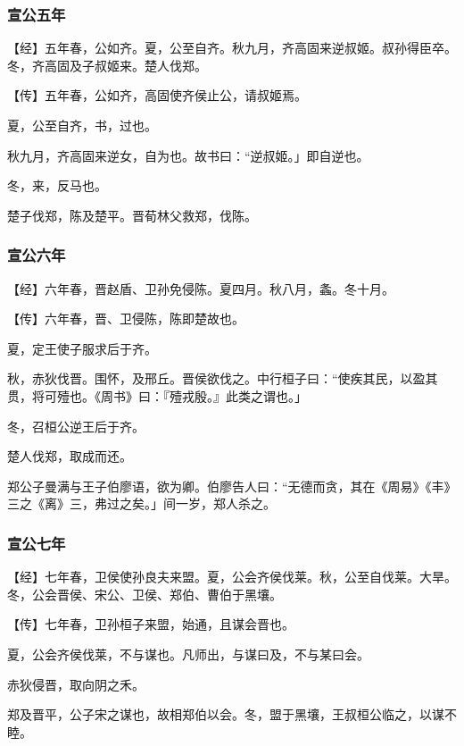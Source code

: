 \documentclass[]{article}
\begin{document}
\hypertarget{header-n1345}{%
\subsubsection{宣公五年}\label{header-n1345}}

【经】五年春，公如齐。夏，公至自齐。秋九月，齐高固来逆叔姬。叔孙得臣卒。冬，齐高固及子叔姬来。楚人伐郑。

【传】五年春，公如齐，高固使齐侯止公，请叔姬焉。

夏，公至自齐，书，过也。

秋九月，齐高固来逆女，自为也。故书曰：``逆叔姬。」即自逆也。

冬，来，反马也。

楚子伐郑，陈及楚平。晋荀林父救郑，伐陈。

\hypertarget{header-n1354}{%
\subsubsection{宣公六年}\label{header-n1354}}

【经】六年春，晋赵盾、卫孙免侵陈。夏四月。秋八月，螽。冬十月。

【传】六年春，晋、卫侵陈，陈即楚故也。

夏，定王使子服求后于齐。

秋，赤狄伐晋。围怀，及邢丘。晋侯欲伐之。中行桓子曰：``使疾其民，以盈其贯，将可殪也。《周书》曰：『殪戎殷。』此类之谓也。」

冬，召桓公逆王后于齐。

楚人伐郑，取成而还。

郑公子曼满与王子伯廖语，欲为卿。伯廖告人曰：``无德而贪，其在《周易》《丰》三之《离》三，弗过之矣。」间一岁，郑人杀之。

\hypertarget{header-n1364}{%
\subsubsection{宣公七年}\label{header-n1364}}

【经】七年春，卫侯使孙良夫来盟。夏，公会齐侯伐莱。秋，公至自伐莱。大旱。冬，公会晋侯、宋公、卫侯、郑伯、曹伯于黑壤。

【传】七年春，卫孙桓子来盟，始通，且谋会晋也。

夏，公会齐侯伐莱，不与谋也。凡师出，与谋曰及，不与某曰会。

赤狄侵晋，取向阴之禾。

郑及晋平，公子宋之谋也，故相郑伯以会。冬，盟于黑壤，王叔桓公临之，以谋不睦。
\end{document}
